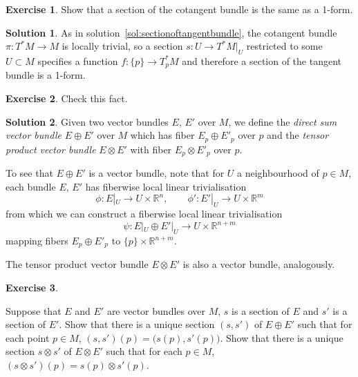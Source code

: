 \documentclass[11pt, a4paper]{report}
\theoremstyle{definition}
\newtheorem{exercise}{Exercise}[part]
\newtheorem{solution}{Solution}[part]
\newenvironment{ex}{\begin{exercise}}{\end{exercise}\pagebreak[1]}
\newenvironment{sol}{\begin{solution}}{\end{solution}\pagebreak[3]}
\begin{document}
\begin{ex}

Show that a section of the cotangent bundle is the same as a 1-form.

\end{ex}

\begin{sol}

As in solution~\ref{sol:sectionoftangentbundle}, the cotangent bundle $\pi: T^*M \to M$ is locally trivial, so a section $s: U \to T^*M|_U$ restricted to some $U \subset M$ specifies a function $f: \{p\} \to T^*_p M$ and therefore a section of the tangent bundle is a 1-form.

\end{sol}

\begin{ex}

Check this fact.

\end{ex}

\begin{sol}

Given two vector bundles $E$, $E'$ over $M$, we define the \emph{direct sum vector bundle} $E \oplus E'$ over $M$ which has fiber $E_p \oplus E'_p$ over $p$ and the \emph{tensor product vector bundle} $E \otimes E'$ with fiber $E_p \otimes E'_p$ over $p$.

To see that $E \oplus E'$ is a vector bundle, note that for $U$ a neighbourhood of $p \in M$, each bundle $E$, $E'$ has fiberwise local linear trivialisation
\[
    \phi: E|_U \to U \times \mathbb{R}^n, \qquad
    \phi': E'|_U \to U \times \mathbb{R}^m
\]
from which we can construct a fiberwise local linear trivialisation
\[
    \psi: E|_U \oplus E'|_U \to U \times \mathbb{R}^{n + m}
\]
mapping fibers $E_p \oplus E'_p$ to $\{p\} \times \mathbb{R}^{n + m}$.

The tensor product vector bundle $E \otimes E'$ is also a vector bundle, analogously.

\end{sol}

\begin{ex}\label{ex:directsumandtensorproductsections}

Suppose that $E$ and $E'$ are vector bundles over $M$, $s$ is a section of $E$ and $s'$ is a section of $E'$.
Show that there is a unique section $(s, s')$ of $E \oplus E'$ such that for each point $p \in M$, $(s, s')(p) = \bigl(s(p), s'(p)\bigr)$.
Show that there is a unique section $s \otimes s'$ of $E \otimes E'$ such that for each $p \in M$, $(s \otimes s')(p) = s(p) \otimes s'(p)$.

\end{ex}
\end{document}
